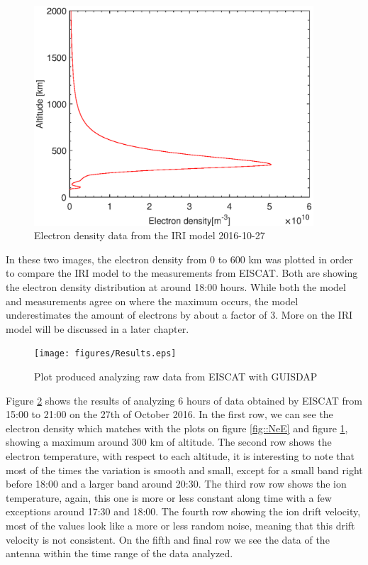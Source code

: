 \begin{minipage}{0.45\textwidth}
	\begin{flushright}
	\begin{figure}[H]
	\centering
	\includegraphics[width=0.93\textwidth]{figures/NeIRI.eps}
	\caption{Electron density data from the IRI model 2016-10-27}
	\label{fig::NeIRI1}
	\end{figure}
	\end{flushright}
\end{minipage}

In these two images, the electron density from 0 to 600 km was plotted in order to compare the IRI model to the measurements from EISCAT. Both are showing the electron density distribution at around 18:00 hours. While both the model and measurements agree on where the maximum occurs, the model underestimates the amount of electrons by about a factor of 3. More on the IRI model will be discussed in a later chapter.

\begin{figure}[H]
	\centering
	\texttt{[image: figures/Results.eps]}
	\caption{Plot produced analyzing raw data from EISCAT with GUISDAP}
	\label{fig::resultsE1}
\end{figure}

\newpage
Figure \ref{fig::resultsE1} shows the results of analyzing 6 hours of data obtained by EISCAT from 15:00  to 21:00 on the 27th of October 2016. In the first row, we can see the electron density which matches with the plots on figure \ref{fig::NeE} and figure \ref{fig::NeIRI1}, showing a maximum around 300 km of altitude. The second row shows the electron temperature, with respect to each altitude, it is interesting to note that most of the times the variation is smooth and small, except for a small band right before 18:00 and a larger band around 20:30. The third row row shows the ion temperature, again, this one is more or less constant along time with a few exceptions around 17:30 and 18:00. The fourth row showing the ion drift velocity,  most of the values look like a more or less random noise, meaning that this drift velocity is not consistent. On the fifth and final row we see the data of the antenna  within the time range of the data analyzed.
\newline
\newline


